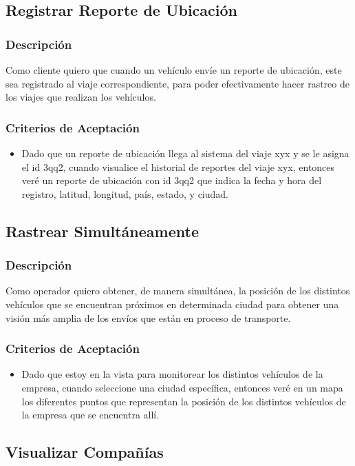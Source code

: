 \documentclass{article}
\begin{document}
\subsection{Registrar Reporte de Ubicación}
\subsubsection{Descripción} 
Como cliente quiero que cuando un vehículo envíe un reporte de ubicación, este sea registrado al viaje correspondiente, para poder efectivamente hacer rastreo de los viajes que realizan los vehículos.
\subsubsection{Criterios de Aceptación}
\begin{itemize}
    \item Dado que un reporte de ubicación llega al sistema del viaje xyx y se le asigna el id 3qq2, cuando visualice el historial de reportes del viaje xyx, entonces veré un reporte de ubicación con id 3qq2 que indica la fecha y hora del registro, latitud, longitud, país, estado, y ciudad.
\end{itemize}

\subsection{Rastrear Simultáneamente}
\subsubsection{Descripción} 
Como operador quiero obtener, de manera simultánea, la posición de los distintos vehículos que se encuentran próximos en determinada ciudad para obtener una visión más amplia de los envíos que están en proceso de transporte.
\subsubsection{Criterios de Aceptación}
\begin{itemize}
    \item Dado que estoy en la vista para monitorear los distintos vehículos de la empresa, cuando seleccione una ciudad específica, entonces veré en un mapa los diferentes puntos que representan la posición de los distintos vehículos de la empresa que se encuentra allí.
\end{itemize}

\subsection{Visualizar Compañías}
\end{document}
